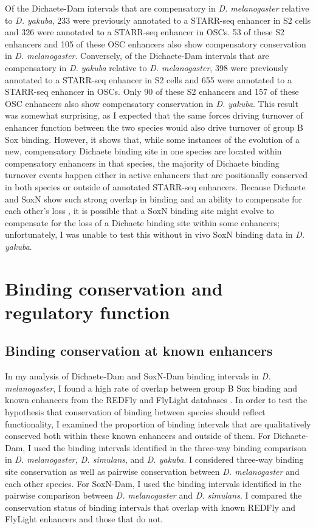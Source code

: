 Of the Dichaete-Dam intervals that are compensatory in \emph{D. melanogaster} relative to \emph{D. yakuba}, 233 were previously annotated to a STARR-seq enhancer in S2 cells and 326 were annotated to a STARR-seq enhancer in OSCs. 53 of these S2 enhancers and 105 of these OSC enhancers also show compensatory conservation in \emph{D. melanogaster}. Conversely, of the Dichaete-Dam intervals that are compensatory in \emph{D. yakuba} relative to \emph{D. melanogaster}, 398 were previously annotated to a STARR-seq enhancer in S2 cells and 655 were annotated to a STARR-seq enhancer in OSCs. Only 90 of these S2 enhancers and 157 of these OSC enhancers also show compensatory conservation in \emph{D. yakuba}. This result was somewhat surprising, as I expected that the same forces driving turnover of enhancer function between the two species would also drive turnover of group B Sox binding. However, it shows that, while some instances of the evolution of a new, compensatory Dichaete binding site in one species are located within compensatory enhancers in that species, the majority of Dichaete binding turnover events happen either in active enhancers that are positionally conserved in both species or outside of annotated STARR-seq enhancers. Because Dichaete and SoxN show such strong overlap in binding and an ability to compensate for each other’s loss \citep{ferrero_soxneuro_2014}, it is possible that a SoxN binding site might evolve to compensate for the loss of a Dichaete binding site within some enhancers; unfortunately, I was unable to test this without in vivo SoxN binding data in \emph{D. yakuba}.\\
 
\section{Binding conservation and regulatory function}
\subsection{Binding conservation at known enhancers}
In my analysis of Dichaete-Dam and SoxN-Dam binding intervals in \emph{D. melanogaster}, I found a high rate of overlap between group B Sox binding and known enhancers from the REDFly and FlyLight databases \citep{gallo_redfly_2010,manning_resource_2012}. In order to test the hypothesis that conservation of binding between species should reflect functionality, I examined the proportion of binding intervals that are qualitatively conserved both within these known enhancers and outside of them. For Dichaete-Dam, I used the binding intervals identified in the three-way binding comparison in \emph{D. melanogaster, D. simulans}, and \emph{D. yakuba}. I considered three-way binding site conservation as well as pairwise conservation between \emph{D. melanogaster} and each other species. For SoxN-Dam, I used the binding intervals identified in the pairwise comparison between \emph{D. melanogaster} and \emph{D. simulans}. I compared the conservation status of binding intervals that overlap with known REDFly and FlyLight enhancers and those that do not.\\

